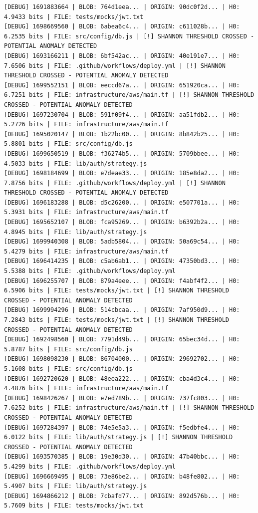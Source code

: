 \documentclass[12pt, a4paper, oneside]{report}
\begin{document}
\begin{lstlisting}[basicstyle=\tiny\ttfamily]
[DEBUG] 1691883664 | BLOB: 764d1eea... | ORIGIN: 90dc0f2d... | H0: 4.9433 bits | FILE: tests/mocks/jwt.txt
[DEBUG] 1698669560 | BLOB: 6abea6c4... | ORIGIN: c611028b... | H0: 6.2535 bits | FILE: src/config/db.js | [!] SHANNON THRESHOLD CROSSED - POTENTIAL ANOMALY DETECTED
[DEBUG] 1693166211 | BLOB: 6bf542ac... | ORIGIN: 40e191e7... | H0: 7.6506 bits | FILE: .github/workflows/deploy.yml | [!] SHANNON THRESHOLD CROSSED - POTENTIAL ANOMALY DETECTED
[DEBUG] 1699552151 | BLOB: eeccd67a... | ORIGIN: 651920ca... | H0: 6.7251 bits | FILE: infrastructure/aws/main.tf | [!] SHANNON THRESHOLD CROSSED - POTENTIAL ANOMALY DETECTED
[DEBUG] 1697230704 | BLOB: 591f09f4... | ORIGIN: aa51fdb2... | H0: 5.2726 bits | FILE: infrastructure/aws/main.tf
[DEBUG] 1695020147 | BLOB: 1b22bc00... | ORIGIN: 8b842b25... | H0: 5.8801 bits | FILE: src/config/db.js
[DEBUG] 1699650519 | BLOB: f36274b5... | ORIGIN: 5709bbee... | H0: 4.5033 bits | FILE: lib/auth/strategy.js
[DEBUG] 1698184699 | BLOB: e7deae33... | ORIGIN: 185e8da2... | H0: 7.8756 bits | FILE: .github/workflows/deploy.yml | [!] SHANNON THRESHOLD CROSSED - POTENTIAL ANOMALY DETECTED
[DEBUG] 1696183288 | BLOB: d5c26200... | ORIGIN: e507701a... | H0: 5.3931 bits | FILE: infrastructure/aws/main.tf
[DEBUG] 1695652107 | BLOB: fca95269... | ORIGIN: b6392b2a... | H0: 4.8945 bits | FILE: lib/auth/strategy.js
[DEBUG] 1699940308 | BLOB: 5adb5804... | ORIGIN: 50a69c54... | H0: 5.4279 bits | FILE: infrastructure/aws/main.tf
[DEBUG] 1696414235 | BLOB: c5ab6ab1... | ORIGIN: 47350bd3... | H0: 5.5388 bits | FILE: .github/workflows/deploy.yml
[DEBUG] 1696255707 | BLOB: 879a4eee... | ORIGIN: f4abf4f2... | H0: 6.5906 bits | FILE: tests/mocks/jwt.txt | [!] SHANNON THRESHOLD CROSSED - POTENTIAL ANOMALY DETECTED
[DEBUG] 1699994296 | BLOB: 514cbcaa... | ORIGIN: 7af950d9... | H0: 7.2843 bits | FILE: tests/mocks/jwt.txt | [!] SHANNON THRESHOLD CROSSED - POTENTIAL ANOMALY DETECTED
[DEBUG] 1692498560 | BLOB: 7791d49b... | ORIGIN: 65bec34d... | H0: 5.8787 bits | FILE: src/config/db.js
[DEBUG] 1698098230 | BLOB: 86704000... | ORIGIN: 29692702... | H0: 5.1608 bits | FILE: src/config/db.js
[DEBUG] 1692720620 | BLOB: 48eea222... | ORIGIN: cba4d3c4... | H0: 4.4876 bits | FILE: infrastructure/aws/main.tf
[DEBUG] 1698426267 | BLOB: e7ed789b... | ORIGIN: 737fc803... | H0: 7.6252 bits | FILE: infrastructure/aws/main.tf | [!] SHANNON THRESHOLD CROSSED - POTENTIAL ANOMALY DETECTED
[DEBUG] 1697284397 | BLOB: 74e5e5a3... | ORIGIN: f5edbfe4... | H0: 6.0122 bits | FILE: lib/auth/strategy.js | [!] SHANNON THRESHOLD CROSSED - POTENTIAL ANOMALY DETECTED
[DEBUG] 1693570385 | BLOB: 19e30d30... | ORIGIN: 47b40bbc... | H0: 5.4299 bits | FILE: .github/workflows/deploy.yml
[DEBUG] 1696669495 | BLOB: 73e86be2... | ORIGIN: b48fe802... | H0: 5.4907 bits | FILE: lib/auth/strategy.js
[DEBUG] 1694866212 | BLOB: 7cbafd77... | ORIGIN: 892d576b... | H0: 5.7609 bits | FILE: tests/mocks/jwt.txt
\end{lstlisting}
\end{document}

